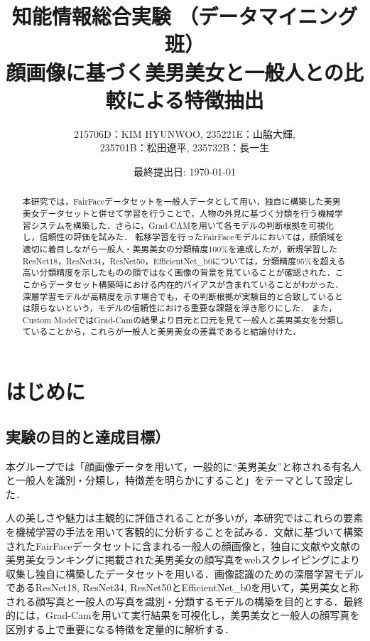 \documentclass[a4paper,11pt,titlepage]{jsarticle}
\begin{document}
\title{知能情報総合実験 （データマイニング班） \\ 顔画像に基づく美男美女と一般人との比較による特徴抽出}
\author{215706D：KIM HYUNWOO, 235221E：山脇大輝,\\ 235701B：松田遼平, 235732B：長一生}
\date{最終提出日: \today}
\maketitle

\tableofcontents
\clearpage

\begin{abstract}
\label{label:abstract}
本研究では，FairFaceデータセットを一般人データとして用い，独自に構築した美男美女データセットと併せて学習を行うことで，人物の外見に基づく分類を行う機械学習システムを構築した．さらに，Grad-CAMを用いて各モデルの判断根拠を可視化し，信頼性の評価を試みた．
転移学習を行ったFairFaceモデルにおいては，顔領域を適切に着目しながら一般人・美男美女の分類精度100\%を達成したが，新規学習したResNet18，ResNet34，ResNet50，EfficientNet\_b0については，分類精度95\%を超える高い分類精度を示したものの顔ではなく画像の背景を見ていることが確認された．ここからデータセット構築時における内在的バイアスが含まれていることがわかった．深層学習モデルが高精度を示す場合でも，その判断根拠が実験目的と合致しているとは限らないという，モデルの信頼性における重要な課題を浮き彫りにした．
また，Custom ModelではGrad-Camの結果より目元と口元を見て一般人と美男美女を分類していることから，これらが一般人と美男美女の差異であると結論付けた．
\end{abstract} 


\section{はじめに}
\label{label:はじめに}
\subsection{実験の目的と達成目標）}
本グループでは「顔画像データを用いて，一般的に“美男美女”と称される有名人と一般人を識別・分類し，特徴差を明らかにすること」をテーマとして設定した．

人の美しさや魅力は主観的に評価されることが多いが，本研究ではこれらの要素を機械学習の手法を用いて客観的に分析することを試みる．文献\cite{karkkainenFairFace}に基づいて構築されたFairFaceデータセットに含まれる一般人の顔画像と，独自に文献\cite{bidanshi}や文献\cite{bijoshi}の美男美女ランキングに掲載された美男美女の顔写真をwebスクレイピングにより収集し独自に構築したデータセットを用いる．画像認識のための深層学習モデルであるResNet18, ResNet34, ResNet50とEfficientNet\_b0を用いて，美男美女と称される顔写真と一般人の写真を識別・分類するモデルの構築を目的とする．最終的には，Grad-Camを用いて実行結果を可視化し，美男美女と一般人の顔写真を区別する上で重要になる特徴を定量的に解析する．\par
\end{document}
